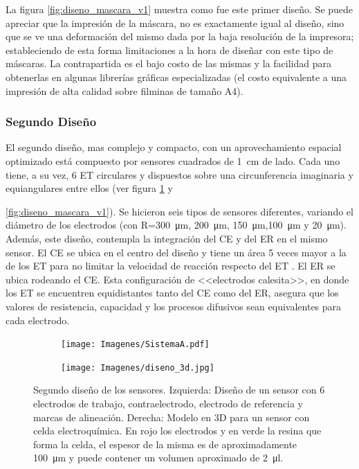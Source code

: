 		      La figura \ref{fig:diseno_mascara_v1} muestra como fue este primer diseño. Se puede apreciar que la impresión de la máscara, no es exactamente igual al diseño, sino que se ve una deformación del mismo dada por la baja resolución de la impresora; estableciendo de esta forma limitaciones a la hora de diseñar con este tipo de máscaras. La contrapartida es el bajo costo de las mismas y la facilidad para obtenerlas en algunas librerías gráficas especializadas (el costo equivalente a una impresión de alta calidad sobre filminas de tamaño A4).
		
 		 \subsubsection{Segundo Diseño}

		 	 El segundo diseño, mas complejo y compacto, con un aprovechamiento espacial optimizado está compuesto por sensores cuadrados de \SI{1}{\cm} de lado. Cada uno tiene, a su vez, 6 ET circulares y dispuestos sobre una circunferencia imaginaria y equiangulares entre ellos (ver figura \ref{fig:mascara_diseno_v2} y {\ref{fig:diseno_mascara_v1}). Se hicieron seis tipos de sensores diferentes, variando el diámetro de los electrodos (con R=\SI{300}{\um}, \SI{200}{\um}, \SI{150}{\um},\SI{100}{\um} y \SI{20}{\um}). Además, este diseño, contempla la integración del CE y del ER en el mismo sensor. El CE se ubica en el centro del diseño y tiene un área 5 veces mayor a la de los ET para no limitar la velocidad de reacción respecto del ET \cite{Wi2000}. El ER se ubica rodeando el CE. Esta configuración de <<electrodos calesita>>, en donde los ET se encuentren equidistantes tanto del CE como del ER, asegura que los valores de resistencia, capacidad y los procesos difusivos sean equivalentes para cada electrodo.

			     \begin{figure}[th!]
			 	    \begin{subfigure}[t]{0.395\textwidth}
			       	\texttt{[image: Imagenes/SistemaA.pdf]}
			    	\end{subfigure}
					\begin{subfigure}[t]{0.595\textwidth}
			        \texttt{[image: Imagenes/diseno\_3d.jpg]}
			        \end{subfigure}
			     	\caption[Segundo diseño y máscara de los sensores]{Segundo diseño de los sensores. Izquierda: Diseño de un sensor con 6 electrodos de trabajo, contraelectrodo, electrodo de referencia y marcas de alineación. Derecha: Modelo en 3D para un sensor con celda electroquímica. En rojo los electrodos y en verde la resina que forma la celda, el espesor de la misma es de aproximadamente \SI{100}{\um} y puede contener un volumen aproximado de \SI{2}{\ul}.}
			     	\label{fig:mascara_diseno_v2}
			     	\end{figure}
	   
}
